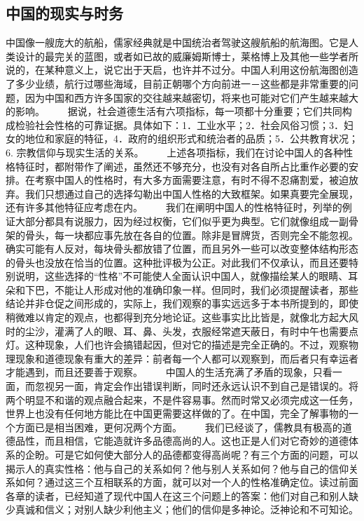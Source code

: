 \documentclass[12pt,oneside]{book}
\begin{document}
\begin{common-format}
\chapter{中国的现实与时务}
中国像一艘庞大的航船，儒家经典就是中国统治者驾驶这艘航船的航海图。它是人类设计的最完关的蓝图，或者如已故的威廉姆斯博士，莱格博上及其他一些学者所说的，在某种意义上，说它出于天启，也许并不过分。中国人利用这份航海图创造了多少业绩，航行过哪些海域，目前正朝哪个方向前进一－这些都是非常重要的问题，因为中国和西方许多国家的交往越来越密切，将来也可能对它们产生越来越大的影响。 
　　据说，社会道德生活有六项指标，每一项都十分重要；它们共同构成检验社会性格的可靠证据。具体如下：1．工业水平；2．社会风俗习惯；3．妇女的地位和家庭的特征，4．政府的组织形式和统治者的品质；5．公共教育状况；6. 宗教信仰与现实生活的关系。 
　　上述各项指标，我们在讨论中国人的各种性格特征时，都附带作了阐述，虽然还不够充分，也没有对各自所占比重作必要的安排。在考察中国人的性格时，有大多方面需要注意，有时不得不忍痛割爱，被迫放弃。我们只想通过自己的选择勾勒出中国人性格的大致框架。如果真要完全展现，还有许多其他特征应考虑在内。 
　　我们在阐明中国人的性格特征时，列举的例证大部分都具有说服力，因为经过权衡，它们似乎更为典型。它们就像组成一副骨架的骨头，每一块都应事先放在各自的位置。除非是冒牌货，否则完全不能忽视。确实可能有人反对，每块骨头都放错了位置，而且另外一些可以改变整体结构形态的骨头也没放在恰当的位置。这种批评极为公正。对此我们不仅承认，而且还要特别说明，这些选择的“性格”不可能使人全面认识中国人，就像描绘某人的眼睛、耳朵和下巴，不能让人形成对他的准确印象一样。但同时，我们必须提醒读者，那些结论并非仓促之间形成的，实际上，我们观察的事实远远多于本书所提到的，即使稍微难以肯定的观点，也都得到充分地论证。这些事实比比皆是，就像北方起大风时的尘沙，灌满了人的眼、耳、鼻、头发，衣服经常遮天蔽日，有时中午也需要点灯。这种现象，人们也许会搞错起因，但对它的描述是完全正确的。不过，观察物理现象和道德现象有重大的差异：前者每一个人都可以观察到，而后者只有幸运者才能遇到，而且还要善于观察。 
　　中国人的生活充满了矛盾的现象，只看一面，而忽视另一面，肯定会作出错误判断，同时还永远认识不到自己是错误的。将两个明显不和谐的观点融合起来，不是件容易事。然而时常又必须完成这一任务，世界上也没有任何地方能比在中国更需要这样做的了。在中国，完全了解事物的一个方面已是相当困难，更何况两个方面。 
　　我们已经谈了，儒教具有极高的道德品性，而且相信，它能造就许多品德高尚的人。这也正是人们对它奇妙的道德体系的企盼。可是它如何使大部分人的品德都变得高尚呢？有三个方面的问题，可以揭示人的真实性格：他与自己的关系如何？他与别人关系如何？他与自己的信仰关系如何？通过这三个互相联系的方面，就可以对一个人的性格准确定位。读过前面各章的读者，已经知道了现代中国人在这三个问题上的答案：他们对自己和别人缺少真诚和信义；对别人缺少利他主义；他们的信仰是多神论。泛神论和不可知论。 

\end{common-format}
\end{document}

